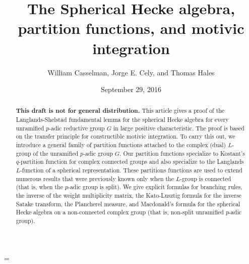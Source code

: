 \documentclass{amsart}
\theoremstyle{plain}
\theoremstyle{definition}
\theoremstyle{remark}
\numberwithin{equation}{subsection}
\begin{document}
\title
    {The Spherical Hecke algebra, partition functions, and motivic integration}
\author{William Casselman, Jorge E. Cely, and Thomas Hales}
\date{September 29, 2016}


\begin{abstract}  
{\bf This draft is not for general distribution.}   
This article gives a proof of the Langlands-Shelstad fundamental 
lemma for the spherical Hecke algebra
for every unramified $p$-adic reductive group $G$ in large positive 
characteristic.  The proof is based on the transfer principle
for constructible motivic integration.    To carry this out,
we introduce a general family of partition functions attached to 
the complex (dual) $L$-group of the unramified $p$-adic group $G$.
Our partition functions specialize to Kostant's $q$-partition 
function for complex connected groups and also 
specialize to the Langlands $L$-function of a spherical representation.
These partitions functions are used to extend numerous 
results that were previously known only when the $L$-group is
connected (that is, when the $p$-adic group is split).
We give explicit formulas for branching rules, the inverse of the weight multiplicity matrix,
the Kato-Lusztig formula for the inverse Satake transform,
the Plancherel measure,  and Macdonald's formula for the spherical Hecke algebra on a
non-connected complex group (that is, non-split unramified $p$-adic group).  
% 
\end{abstract}


\parskip=\baselineskip

 \maketitle



    

      
      
       
      
      
\end{document}
